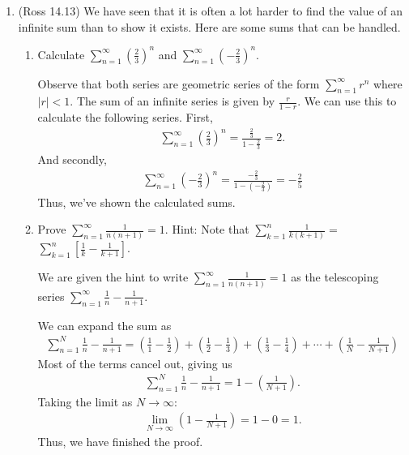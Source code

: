 \documentclass [10pt]{article}
\newcommand{\jg}[1]{{\color{blue} #1}}
\begin{document}
\begin{enumerate}

\item (Ross 14.13) We have seen that it is often a lot harder to find the value of
an infinite sum than to show it exists. Here are some sums that can be handled.

\begin{enumerate}
\item Calculate $\sum_{n=1}^{\infty}\left(\frac{2}{3}\right)^n$ and $\sum_{n=1}^{\infty}\left(-\frac{2}{3}\right)^n$.

\jg{
Observe that both series are geometric series of the form $\sum_{n=1}^\infty r^n$ where $| r | < 1$. The sum of an infinite series is given by $\frac{r}{1-r}$. We can use this to calculate the following series. First,
\begin{align*}
    \sum_{n=1}^{\infty}\left(\frac{2}{3}\right)^n = \frac{\frac{2}{3}}{1 - \frac{2}{3}} = 2. 
\end{align*}
And secondly, 
\begin{align*}
    \sum_{n=1}^{\infty}\left(-\frac{2}{3}\right)^n = \frac{-\frac{2}{3}}{1 - (-\frac{2}{3})} = -\frac{2}{5}
\end{align*}
Thus, we've shown the calculated sums. 
}


\item Prove $\sum_{n=1}^{\infty} \frac{1}{n(n+1)}=1$. Hint: Note that $\sum_{k=1}^n \frac{1}{k(k+1)}=$ $\sum_{k=1}^n\left[\frac{1}{k}-\frac{1}{k+1}\right]
$.

\jg{
We are given the hint to write $\sum_{n=1}^{\infty} \frac{1}{n(n+1)}=1$ as the telescoping series $\sum_{n=1}^{\infty} \frac{1}{n} - \frac{1}{n+1}$. 

We can expand the sum as 
\begin{align*}
    \sum_{n=1}^{N} \frac{1}{n} - \frac{1}{n+1} = \left(\frac{1}{1} - \frac{1}{2} \right) + \left(\frac{1}{2} - \frac{1}{3} \right) + \left(\frac{1}{3} - \frac{1}{4} \right) + \cdots + \left(\frac{1}{N} - \frac{1}{N+1} \right)
\end{align*}
Most of the terms cancel out, giving us
\begin{align*}
    \sum_{n=1}^{N} \frac{1}{n} - \frac{1}{n+1} = 1 - \left( \frac{1}{N+1}\right).
\end{align*}
Taking the limit as $N \rightarrow \infty$:
\begin{align*}
    \lim_{N \rightarrow \infty} \left( 1 - \frac{1}{N+1}\right) = 1- 0 = 1.
\end{align*}
Thus, we have finished the proof. 

}
\end{enumerate}
\end{enumerate}
\end{document}
